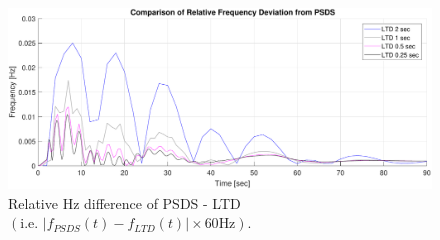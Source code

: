 \documentclass[12pt]{article}
\begin{document}
	\begin{figure}[h!]
			\centering
			\includegraphics[width=\linewidth]{tsCompRelF}\vspace{-1em}
			\caption{Relative Hz difference of PSDS - LTD $\left( \text{i.e. }  \left|f_{PSDS}(t)- f_{LTD}(t)\right| \times 60 \text{Hz} \right)$.}
			\label{tsComp}		 
	\end{figure}\vspace{-.5em}
\end{document}
